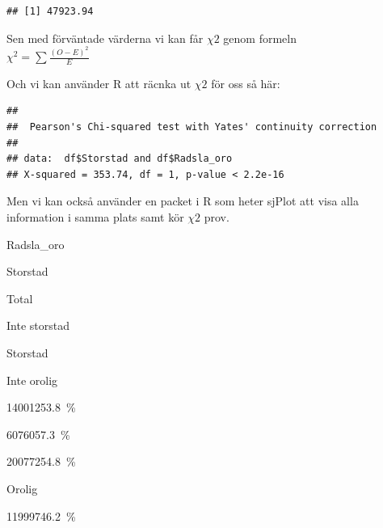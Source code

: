 \documentclass[
]{book}
\newenvironment{Shaded}{\begin{snugshade}}{\end{snugshade}}
\newcommand{\AttributeTok}[1]{\textcolor[rgb]{0.13,0.29,0.53}{#1}}
\newcommand{\ConstantTok}[1]{\textcolor[rgb]{0.56,0.35,0.01}{#1}}
\newcommand{\FunctionTok}[1]{\textcolor[rgb]{0.13,0.29,0.53}{\textbf{#1}}}
\newcommand{\NormalTok}[1]{#1}
\newcommand{\SpecialCharTok}[1]{\textcolor[rgb]{0.81,0.36,0.00}{\textbf{#1}}}
\begin{document}
\begin{verbatim}
## [1] 47923.94
\end{verbatim}

Sen med förväntade värderna vi kan får \(\chi {2}\) genom formeln\\
\(\chi ^{2}=\sum \frac{(O-E)^2}{E}\)

Och vi kan använder R att räcnka ut \(\chi {2}\) för oss så här:

\begin{Shaded}
\end{Shaded}

\begin{verbatim}
## 
##  Pearson's Chi-squared test with Yates' continuity correction
## 
## data:  df$Storstad and df$Radsla_oro
## X-squared = 353.74, df = 1, p-value < 2.2e-16
\end{verbatim}

Men vi kan också använder en packet i R som heter sjPlot att visa alla information i samma plats samt kör \(\chi {2}\) prov.

\begin{Shaded}
\end{Shaded}

Radsla\_oro

Storstad

Total

Inte storstad

Storstad

Inte orolig

{140012}{53.8~\%}

{60760}{57.3~\%}

{200772}{54.8~\%}

Orolig

{119997}{46.2~\%}
\end{document}

